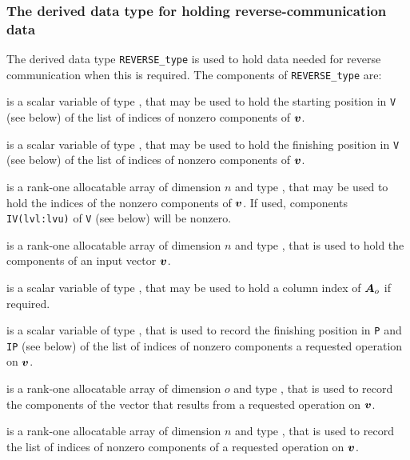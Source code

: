 \documentclass{galahad}
\begin{document}




\subsubsection{The derived data type for holding reverse-communication data}\label{typereverse}
The derived data type
{\tt REVERSE\_type}
is used to hold data needed for reverse communication when this is
required.
The components of
{\tt REVERSE\_type}
are:

\begin{description}

 is a scalar variable of type \integer, that
may be used to hold the starting position in {\tt V} (see below)
of the list of indices of nonzero components of ${\bm{v}}$.

 is a scalar variable of type \integer, that
may be used to hold the finishing position in {\tt V} (see below)
of the list of indices of nonzero components of ${\bm{v}}$.

 is a rank-one allocatable array of dimension $n$
and type \integer, that may be used to hold the indices of the
nonzero components of ${\bm{v}}$. If used, components
{\tt IV(lvl:lvu)} of {\tt V} (see below) will be nonzero.

 is a rank-one allocatable array of dimension $n$
and type \realdp, that is used to hold the components of an
input vector ${\bm{v}}$.

 is a scalar variable of type \integer, that
may be used to hold a column index of ${\bm{A}}_o$ if required.

 is a scalar variable of type \integer, that
is used to record the finishing position in 
{\tt P} and {\tt IP} (see below)
of the list of indices of nonzero components a requested operation on ${\bm{v}}$.

 is a rank-one allocatable array of dimension $o$
and type \realdp, that is used to record the components of the
vector that results from a requested operation on ${\bm{v}}$.

 is a rank-one allocatable array of dimension $n$
and type \integer, that is used to record the list of
indices of nonzero components of a requested operation on ${\bm{v}}$.

\end{description}
\end{document}
